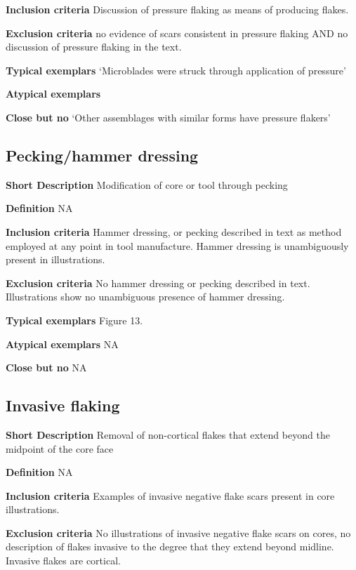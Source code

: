 \documentclass[
]{article}
\begin{document}
\textbf{Inclusion criteria} Discussion of pressure flaking as means of
producing flakes.

\textbf{Exclusion criteria} no evidence of scars consistent in pressure
flaking AND no discussion of pressure flaking in the text.

\textbf{Typical exemplars} `Microblades were struck through application
of pressure'

\textbf{Atypical exemplars}

\textbf{Close but no} `Other assemblages with similar forms have
pressure flakers'

\hypertarget{peckinghammer-dressing}{%
\subsection{Pecking/hammer dressing}\label{peckinghammer-dressing}}

\textbf{Short Description} Modification of core or tool through pecking

\textbf{Definition} NA

\textbf{Inclusion criteria} Hammer dressing, or pecking described in
text as method employed at any point in tool manufacture. Hammer
dressing is unambiguously present in illustrations.

\textbf{Exclusion criteria} No hammer dressing or pecking described in
text. Illustrations show no unambiguous presence of hammer dressing.

\textbf{Typical exemplars} Figure 13.

\textbf{Atypical exemplars} NA

\textbf{Close but no} NA

\hypertarget{invasive-flaking}{%
\subsection{Invasive flaking}\label{invasive-flaking}}

\textbf{Short Description} Removal of non-cortical flakes that extend
beyond the midpoint of the core face

\textbf{Definition} NA

\textbf{Inclusion criteria} Examples of invasive negative flake scars
present in core illustrations.

\textbf{Exclusion criteria} No illustrations of invasive negative flake
scars on cores, no description of flakes invasive to the degree that
they extend beyond midline. Invasive flakes are cortical.
\end{document}
